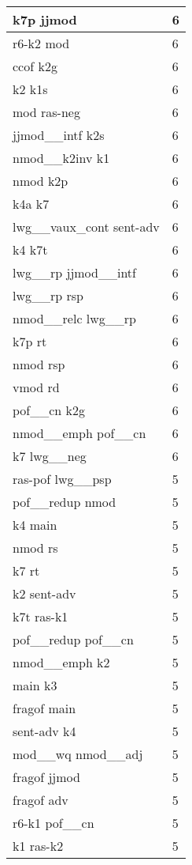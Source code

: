 \documentclass[a4 paper]{article}
\begin{document}
\begin{longtable}{p{}p{}}
k7p jjmod  & 6 \\ \midrule
r6-k2 mod  & 6 \\ \midrule
ccof k2g  & 6 \\ \midrule
k2 k1s  & 6 \\ \midrule
mod ras-neg  & 6 \\ \midrule
jjmod\_\_intf k2s  & 6 \\ \midrule
nmod\_\_k2inv k1  & 6 \\ \midrule
nmod k2p  & 6 \\ \midrule
k4a k7  & 6 \\ \midrule
lwg\_\_vaux\_cont sent-adv  & 6 \\ \midrule
k4 k7t  & 6 \\ \midrule
lwg\_\_rp jjmod\_\_intf  & 6 \\ \midrule
lwg\_\_rp rsp  & 6 \\ \midrule
nmod\_\_relc lwg\_\_rp  & 6 \\ \midrule
k7p rt  & 6 \\ \midrule
nmod rsp  & 6 \\ \midrule
vmod rd  & 6 \\ \midrule
pof\_\_cn k2g  & 6 \\ \midrule
nmod\_\_emph pof\_\_cn  & 6 \\ \midrule
k7 lwg\_\_neg  & 6 \\ \midrule
ras-pof lwg\_\_psp  & 5 \\ \midrule
pof\_\_redup nmod  & 5 \\ \midrule
k4 main  & 5 \\ \midrule
nmod rs  & 5 \\ \midrule
k7 rt  & 5 \\ \midrule
k2 sent-adv  & 5 \\ \midrule
k7t ras-k1  & 5 \\ \midrule
pof\_\_redup pof\_\_cn  & 5 \\ \midrule
nmod\_\_emph k2  & 5 \\ \midrule
main k3  & 5 \\ \midrule
fragof main  & 5 \\ \midrule
sent-adv k4  & 5 \\ \midrule
mod\_\_wq nmod\_\_adj  & 5 \\ \midrule
fragof jjmod  & 5 \\ \midrule
fragof adv  & 5 \\ \midrule
r6-k1 pof\_\_cn  & 5 \\ \midrule
k1 ras-k2  & 5 \\ \midrule

\end{longtable}
\end{document}
